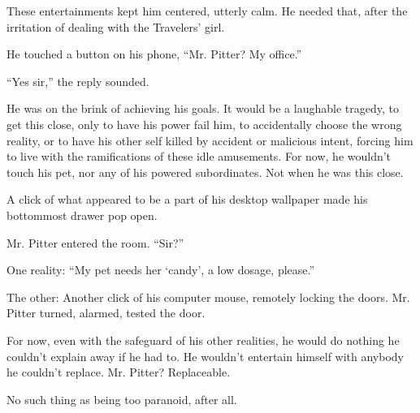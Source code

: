 These entertainments kept him centered, utterly calm.  He needed that, after the irritation of dealing with the Travelers' girl.



He touched a button on his phone, ``Mr. Pitter?  My office.''



``Yes sir,'' the reply sounded.



He was on the brink of achieving his goals.  It would be a laughable tragedy, to get this close, only to have his power fail him, to accidentally choose the wrong reality, or to have his other self killed by accident or malicious intent, forcing him to live with the ramifications of these idle amusements.  For now, he wouldn't touch his pet, nor any of his powered subordinates.  Not when he was this close.



A click of what appeared to be a part of his desktop wallpaper made his bottommost drawer pop open.



Mr. Pitter entered the room.  ``Sir?''



One reality: ``My pet needs her `candy', a low dosage, please.''



The other: Another click of his computer mouse, remotely locking the doors.  Mr. Pitter turned, alarmed, tested the door.



For now, even with the safeguard of his other realities, he would do nothing he couldn't explain away if he had to.  He wouldn't entertain himself with anybody he couldn't replace.  Mr. Pitter?  Replaceable.



No such thing as being too paranoid, after all.

